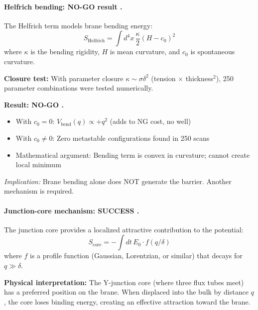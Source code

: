 \paragraph{Helfrich bending: NO-GO result \tagDc{}.}

The Helfrich term models brane bending energy:
\begin{equation}
\label{eq:helfrich}
S_{\mathrm{Helfrich}} = \int d^4x \, \frac{\kappa}{2} (H - c_0)^2
\end{equation}
where $\kappa$ is the bending rigidity, $H$ is mean curvature, and $c_0$ is spontaneous curvature.

\textbf{Closure test:} With parameter closure $\kappa \sim \sigma \delta^2$ (tension $\times$ thickness$^2$),
250 parameter combinations were tested numerically.

\textbf{Result: NO-GO \tagDc{}.}
\begin{itemize}[nosep]
  \item With $c_0 = 0$: $V_{\mathrm{bend}}(q) \propto +q^2$ (adds to NG cost, no well)
  \item With $c_0 \neq 0$: Zero metastable configurations found in 250 scans
  \item Mathematical argument: Bending term is convex in curvature; cannot create local minimum
\end{itemize}

\emph{Implication:} Brane bending alone does NOT generate the barrier. Another mechanism is required.

\paragraph{Junction-core mechanism: SUCCESS \tagDc{}.}

The junction core provides a localized attractive contribution to the potential:
\begin{equation}
\label{eq:junction_core}
S_{\mathrm{core}} = -\int dt \, E_0 \cdot f(q/\delta)
\end{equation}
where $f$ is a profile function (Gaussian, Lorentzian, or similar) that decays for $q \gg \delta$.

\textbf{Physical interpretation:} The Y-junction core (where three flux tubes meet) has
a preferred position on the brane. When displaced into the bulk by distance $q$, the core
loses binding energy, creating an effective attraction toward the brane.

